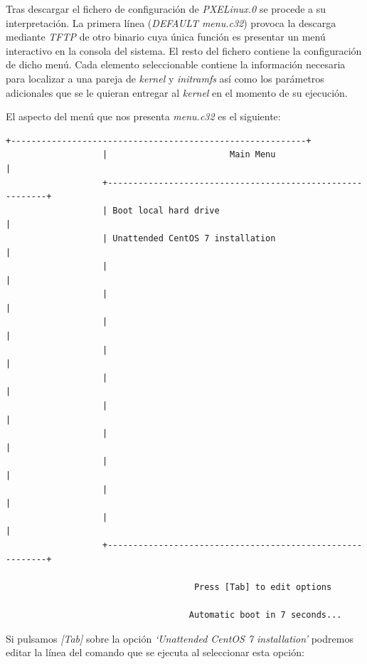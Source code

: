 \documentclass[a4paper,12pt,spanish,final]{epsc_tfc_pfc}
\begin{document}
Tras descargar el fichero de configuración de \emph{PXELinux.0} se procede a su interpretación. La primera línea (\emph{DEFAULT menu.c32}) provoca la descarga mediante \emph{TFTP} de otro binario cuya única función es presentar un menú interactivo en la consola del sistema. El resto del fichero contiene la configuración de dicho menú. Cada elemento seleccionable contiene la información necesaria para localizar a una pareja de \emph{kernel} y \emph{initramfs} así como los parámetros adicionales que se le quieran entregar al \emph{kernel} en el momento de su ejecución.

El aspecto del menú que nos presenta \emph{menu.c32} es el siguiente:\\

\begin{lstlisting}[style=dnsmasq]
                   +----------------------------------------------------------+
                   |                        Main Menu                         |
                   +----------------------------------------------------------+
                   | Boot local hard drive                                    |
                   | Unattended CentOS 7 installation                         |
                   |                                                          |
                   |                                                          |
                   |                                                          |
                   |                                                          |
                   |                                                          |
                   |                                                          |
                   |                                                          |
                   |                                                          |
                   |                                                          |
                   |                                                          |
                   +----------------------------------------------------------+

                                     Press [Tab] to edit options

                                    Automatic boot in 7 seconds...
\end{lstlisting}

Si pulsamos \emph{[Tab]} sobre la opción \emph{`Unattended CentOS 7 installation'} podremos editar la línea del comando que se ejecuta al seleccionar esta opción:\\
\end{document}

